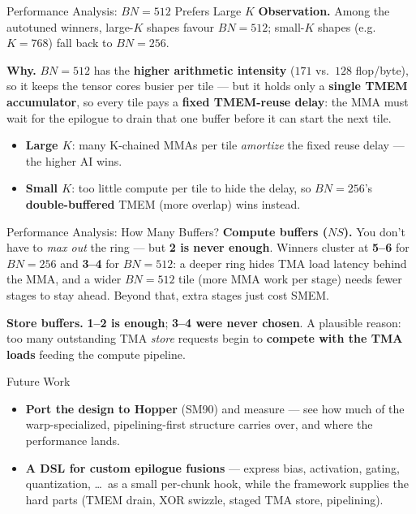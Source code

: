 \documentclass[aspectratio=169,professionalfonts]{beamer}
\begin{document}
\begin{frame}{Performance Analysis: $BN{=}512$ Prefers Large $K$}
  \textbf{Observation.} Among the autotuned winners, large-$K$ shapes favour
  \textbf{$BN{=}512$}; small-$K$ shapes (e.g.\ $K{=}768$) fall back to
  \textbf{$BN{=}256$}.

  \vspace{0.3cm}
  \textbf{Why.} $BN{=}512$ has the \textbf{higher arithmetic intensity}
  ($171$ vs.\ $128$ flop/byte), so it keeps the tensor cores busier per tile ---
  but it holds only a \textbf{single TMEM accumulator}, so every tile pays a
  \textbf{fixed TMEM-reuse delay}: the MMA must wait for the epilogue to drain
  that one buffer before it can start the next tile.

  \vspace{0.3cm}
  \begin{itemize}
    \item \textbf{Large $K$}: many K-chained MMAs per tile \emph{amortize} the
      fixed reuse delay --- the higher AI wins.
    \item \textbf{Small $K$}: too little compute per tile to hide the delay, so
      $BN{=}256$'s \textbf{double-buffered} TMEM (more overlap) wins instead.
  \end{itemize}
\end{frame}

\begin{frame}{Performance Analysis: How Many Buffers?}
  \textbf{Compute buffers ($NS$).} You don't have to \emph{max out} the ring ---
  but \textbf{2 is never enough}. Winners cluster at \textbf{5--6} for $BN{=}256$
  and \textbf{3--4} for $BN{=}512$: a deeper ring hides TMA load latency behind the
  MMA, and a wider $BN{=}512$ tile (more MMA work per stage) needs fewer stages to
  stay ahead. Beyond that, extra stages just cost SMEM.

  \vspace{0.4cm}
  \textbf{Store buffers.} \textbf{1--2 is enough}; \textbf{3--4 were never chosen}.
  A plausible reason: too many outstanding TMA \emph{store} requests begin to
  \textbf{compete with the TMA loads} feeding the compute pipeline.
\end{frame}

\begin{frame}{Future Work}
  \vspace{0.3cm}
  \begin{itemize}
    \setlength{\itemsep}{0.5cm}
    \item \textbf{Port the design to Hopper} (SM90) and measure --- see how much
      of the warp-specialized, pipelining-first structure carries over, and where
      the performance lands.
    \item \textbf{A DSL for custom epilogue fusions} --- express bias, activation,
      gating, quantization, \ldots\ as a small per-chunk hook, while the framework
      supplies the hard parts (TMEM drain, XOR swizzle, staged TMA store,
      pipelining).
  \end{itemize}
\end{frame}
\end{document}
